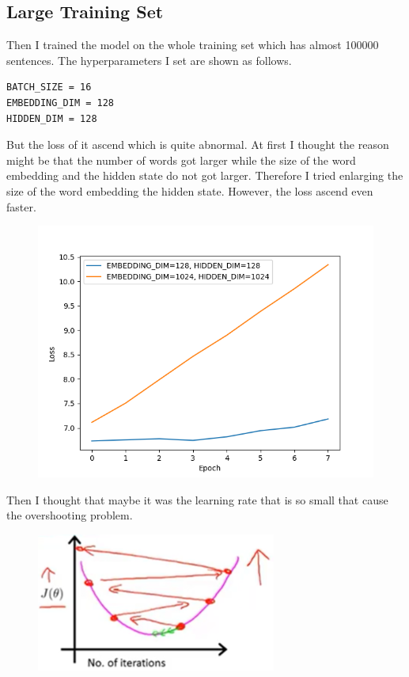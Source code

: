 \documentclass[UTF8, a4paper, 11pt]{article}
\begin{document}
\subsection{Large Training Set}
Then I trained the model on the whole training set which has almost 100000 sentences. The hyperparameters I set are shown as follows.
\begin{lstlisting}
BATCH_SIZE = 16
EMBEDDING_DIM = 128
HIDDEN_DIM = 128
\end{lstlisting}
But the loss of it ascend which is quite abnormal. At first I thought the reason might be that the number of words got larger while the size of the word embedding
and the hidden state do not got larger. Therefore I tried enlarging the size of the word embedding the hidden state. However, the loss ascend even faster.
\begin{figure}[H]
      \centering
      \includegraphics[width = 0.8 \textwidth]{1024.png}
\end{figure}
Then I thought that maybe it was the learning rate that is so small that cause the overshooting problem.
\begin{figure}[H]
      \centering
      \includegraphics[width = 0.8 \textwidth]{overshoot.png}
\end{figure}
\end{document}
